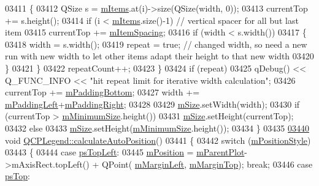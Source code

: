 \begin{DoxyCode}
03411     \{
03412       QSize s = \hyperlink{a00045_a9ae61eaf9434d9f315696bf03c8e4455}{mItems}.at(i)->size(QSize(width, 0));
03413       currentTop += s.height();
03414       \textcolor{keywordflow}{if} (i < \hyperlink{a00045_a9ae61eaf9434d9f315696bf03c8e4455}{mItems}.size()-1) \textcolor{comment}{// vertical spacer for all but last item}
03415         currentTop += \hyperlink{a00045_acb16d1d1f6289185e8a5be2ea7f7d635}{mItemSpacing};
03416       \textcolor{keywordflow}{if} (width < s.width())
03417       \{
03418         width = s.width();
03419         repeat = \textcolor{keyword}{true}; \textcolor{comment}{// changed width, so need a new run with new width to let other items adapt their
       height to that new width}
03420       \}
03421     \}
03422     repeatCount++;
03423   \}
03424   \textcolor{keywordflow}{if} (repeat)
03425     qDebug() << Q\_FUNC\_INFO << \textcolor{stringliteral}{"hit repeat limit for iterative width calculation"};
03426   currentTop += \hyperlink{a00045_a49f6b31aeee68cfce9fe57aaf0cc6ce1}{mPaddingBottom};
03427   width += \hyperlink{a00045_ab7b535988eb6f9d0e4ae6c33ca0e5b03}{mPaddingLeft}+\hyperlink{a00045_a99eb704ee554eece4dac0833cbc5ee91}{mPaddingRight};
03428   
03429   \hyperlink{a00045_aa55b33bf64e26c76e6475fd3140af8a2}{mSize}.setWidth(width);
03430   \textcolor{keywordflow}{if} (currentTop > \hyperlink{a00045_a52f5ad2b7fe948e98286447165953c40}{mMinimumSize}.height())
03431     \hyperlink{a00045_aa55b33bf64e26c76e6475fd3140af8a2}{mSize}.setHeight(currentTop);
03432   \textcolor{keywordflow}{else}
03433     \hyperlink{a00045_aa55b33bf64e26c76e6475fd3140af8a2}{mSize}.setHeight(\hyperlink{a00045_a52f5ad2b7fe948e98286447165953c40}{mMinimumSize}.height());
03434 \}
03435 
\hypertarget{a00115_source_l03440}{}\hyperlink{a00045_a1e81744daf2b51ed7025e7357d6f88a1}{03440} \textcolor{keywordtype}{void} \hyperlink{a00045_a1e81744daf2b51ed7025e7357d6f88a1}{QCPLegend::calculateAutoPosition}()
03441 \{
03442   \textcolor{keywordflow}{switch} (\hyperlink{a00045_abd6cf2517b85e73c98b8f00c3a4104c0}{mPositionStyle})
03443   \{
03444     \textcolor{keywordflow}{case} \hyperlink{a00045_aa61c3d82a6c7942dddefbf1ed1f7049fa1f5bb82f19be99ee3722a540b76c3c85}{psTopLeft}:
03445       \hyperlink{a00045_a1a1033e581aba17a234a320b7fffc739}{mPosition} = \hyperlink{a00044_aa2a528433e44db02b8aef23c1f9f90ed}{mParentPlot}->mAxisRect.topLeft() + QPoint(
      \hyperlink{a00045_abc32b5c03a201ff2a4225503c0f5c8e0}{mMarginLeft}, \hyperlink{a00045_a1eb13f7b277274a6de2d739a2498d2d5}{mMarginTop}); \textcolor{keywordflow}{break};
03446     \textcolor{keywordflow}{case} \hyperlink{a00045_aa61c3d82a6c7942dddefbf1ed1f7049fa7ca820289c7938092f497fbd4d706f5d}{psTop}:

\end{DoxyCode}
